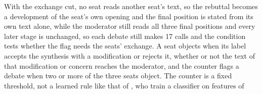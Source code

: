 With the exchange cut, no seat reads another seat's
text, so the rebuttal becomes a development of the seat's own opening and the
final position is stated from its own text alone, while the moderator still
reads all three final positions and every later stage is unchanged, so each
debate still makes 17 calls and the condition tests whether the flag needs
the seats' exchange.
A seat objects when its label accepts the synthesis with a modification or
rejects it, whether or not the text of that modification or concern reaches
the moderator,
and the counter flags a debate when two or more of the three seats object.
The counter is a fixed threshold, not a learned rule like that of
\citet{he2026minoritysentinel}, who train a classifier on features of
